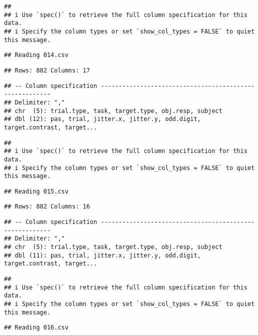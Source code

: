 \documentclass[
]{article}
\begin{document}
\begin{verbatim}
## 
## i Use `spec()` to retrieve the full column specification for this data.
## i Specify the column types or set `show_col_types = FALSE` to quiet this message.
\end{verbatim}

\begin{verbatim}
## Reading 014.csv
\end{verbatim}

\begin{verbatim}
## Rows: 882 Columns: 17
\end{verbatim}

\begin{verbatim}
## -- Column specification --------------------------------------------------------
## Delimiter: ","
## chr  (5): trial.type, task, target.type, obj.resp, subject
## dbl (12): pas, trial, jitter.x, jitter.y, odd.digit, target.contrast, target...
\end{verbatim}

\begin{verbatim}
## 
## i Use `spec()` to retrieve the full column specification for this data.
## i Specify the column types or set `show_col_types = FALSE` to quiet this message.
\end{verbatim}

\begin{verbatim}
## Reading 015.csv
\end{verbatim}

\begin{verbatim}
## Rows: 882 Columns: 16
\end{verbatim}

\begin{verbatim}
## -- Column specification --------------------------------------------------------
## Delimiter: ","
## chr  (5): trial.type, task, target.type, obj.resp, subject
## dbl (11): pas, trial, jitter.x, jitter.y, odd.digit, target.contrast, target...
\end{verbatim}

\begin{verbatim}
## 
## i Use `spec()` to retrieve the full column specification for this data.
## i Specify the column types or set `show_col_types = FALSE` to quiet this message.
\end{verbatim}

\begin{verbatim}
## Reading 016.csv
\end{verbatim}
\end{document}
